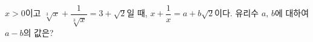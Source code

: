 $x>0$이고 $\sqrt[3]{x}+\dfrac{1}{\sqrt[3]{x}}=3+\sqrt{2}$일 때, $x+\dfrac{1}{x}=a+b\sqrt{2}$이다. 유리수 $a$, $b$에 대하여 $a-b$의 값은?
